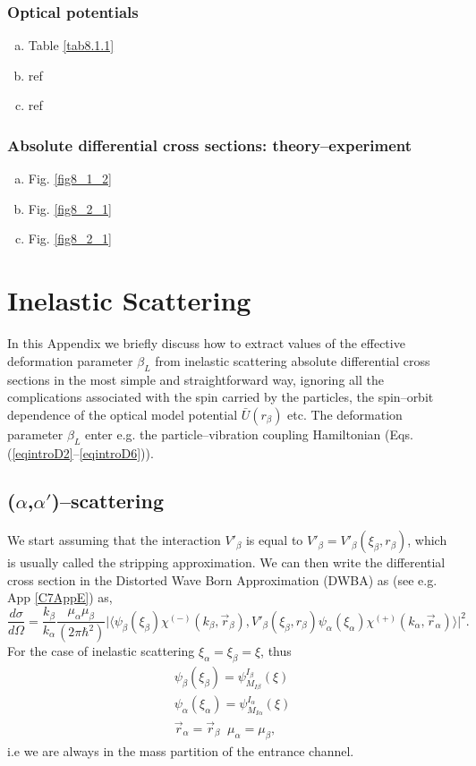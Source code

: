 \begin{subappendices}
\subsubsection{Optical potentials}
\begin{enumerate}[a)]
\item{Table \ref{tab8.1.1}}
\item{ref}
\item{ref}
\end{enumerate}
\subsubsection{Absolute differential cross sections: theory--experiment}
\begin{enumerate}[a)]
\item{Fig. \ref{fig8_1_2}}
\item{Fig. \ref{fig8_2_1}}
\item{Fig. \ref{fig8_2_1}}
\end{enumerate}
\section{Inelastic Scattering}\label{appintroE}
In this Appendix we briefly discuss   how to extract values of the effective deformation parameter $\beta_L$ from inelastic scattering absolute differential cross sections in the most simple and straightforward way, ignoring all the complications associated with the spin carried by the particles, the spin--orbit dependence of the optical model potential $\bar{U}(r_\beta)$ etc. The deformation parameter $\beta_L$ enter e.g. the particle--vibration coupling Hamiltonian (Eqs. (\ref{eqintroD2}--\ref{eqintroD6})).
\subsection{($\alpha$,$\alpha'$)--scattering}
We start assuming that the interaction $V'_\beta$ is equal to $V'_\beta=V'_\beta(\xi_\beta,r_\beta)$, which is usually called the stripping approximation.
We can then write the differential cross section in the Distorted Wave Born Approximation (DWBA) as (see e.g. App \ref{C7AppE}) as,
\begin{equation}\label{eq4l1}
 \frac{d\sigma}{d\Omega}=\frac{k_\beta}{k_\alpha}\frac{\mu_\alpha \mu_\beta}{(2 \pi \hbar^2)}\vert\langle
\psi_\beta(\xi_\beta)\chi^{(-)}(k_\beta,\vec{r}_\beta),V'_\beta(\xi_\beta,r_\beta) \psi_\alpha(\xi_\alpha)\chi^{(+)}(k_\alpha,\vec{r}_\alpha)\rangle\vert^2.
\end{equation}
For the case of inelastic scattering $\xi_\alpha=\xi_\beta=\xi$, thus
\begin{subequations}
\begin{align}\label{eq4l2}
\psi_\beta(\xi_\beta)=\psi_{M_{I\beta}}^{I_\beta}(\xi)\\
\psi_\alpha(\xi_\alpha)=\psi_{M_{I\alpha}}^{I_\alpha}(\xi)\\
\vec{r}_\alpha=\vec{r}_\beta\;\;\mu_\alpha =\mu_\beta,
\end{align}
\end{subequations}
i.e we are always in the mass partition of the entrance channel.


\end{subappendices}
